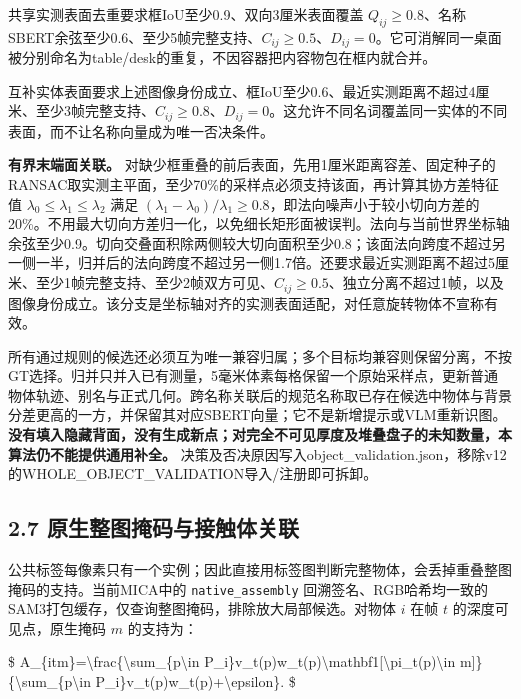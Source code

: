 \documentclass[UTF8,fontset=fandol]{ctexart}
\begin{document}
共享实测表面去重要求框IoU至少0.9、双向3厘米表面覆盖 $Q_{ij}\ge0.8$、名称SBERT余弦至少0.6、至少5帧完整支持、$C_{ij}\ge0.5$、$D_{ij}=0$。它可消解同一桌面被分别命名为table/desk的重复，不因容器把内容物包在框内就合并。



互补实体表面要求上述图像身份成立、框IoU至少0.6、最近实测距离不超过4厘米、至少3帧完整支持、$C_{ij}\ge0.8$、$D_{ij}=0$。这允许不同名词覆盖同一实体的不同表面，而不让名称向量成为唯一否决条件。



\textbf{有界末端面关联。} 对缺少框重叠的前后表面，先用1厘米距离容差、固定种子的RANSAC取实测主平面，至少70\%的采样点必须支持该面，再计算其协方差特征值 $\lambda_0\le\lambda_1\le\lambda_2$ 满足 $(\lambda_1-\lambda_0)/\lambda_1\ge0.8$，即法向噪声小于较小切向方差的20\%。不用最大切向方差归一化，以免细长矩形面被误判。法向与当前世界坐标轴余弦至少0.9。切向交叠面积除两侧较大切向面积至少0.8；该面法向跨度不超过另一侧一半，归并后的法向跨度不超过另一侧1.7倍。还要求最近实测距离不超过5厘米、至少1帧完整支持、至少2帧双方可见、$C_{ij}\ge0.5$、独立分离不超过1帧，以及图像身份成立。该分支是坐标轴对齐的实测表面适配，对任意旋转物体不宣称有效。



所有通过规则的候选还必须互为唯一兼容归属；多个目标均兼容则保留分离，不按GT选择。归并只并入已有测量，5毫米体素每格保留一个原始采样点，更新普通物体轨迹、别名与正式几何。跨名称关联后的规范名称取已存在候选中物体与背景分差更高的一方，并保留其对应SBERT向量；它不是新增提示或VLM重新识图。\textbf{没有填入隐藏背面，没有生成新点；对完全不可见厚度及堆叠盘子的未知数量，本算法仍不能提供通用补全。} 决策及否决原因写入object\_validation.json，移除v12的WHOLE\_OBJECT\_VALIDATION导入/注册即可拆卸。



\subsection*{2.7 原生整图掩码与接触体关联}

公共标签每像素只有一个实例；因此直接用标签图判断完整物体，会丢掉重叠整图掩码的支持。当前MICA中的 \texttt{native\_\allowbreak{}assembly} 回溯签名、RGB哈希均一致的SAM3打包缓存，仅查询整图掩码，排除放大局部候选。对物体 $i$ 在帧 $t$ 的深度可见点，原生掩码 $m$ 的支持为：



\$
A\_\{itm\}=\textbackslash{}frac\{\textbackslash{}sum\_\{p\textbackslash{}in P\_i\}v\_t(p)w\_t(p)\textbackslash{}mathbf1[\textbackslash{}pi\_t(p)\textbackslash{}in m]\}\{\textbackslash{}sum\_\{p\textbackslash{}in P\_i\}v\_t(p)w\_t(p)+\textbackslash{}epsilon\}.
\$
\end{document}

